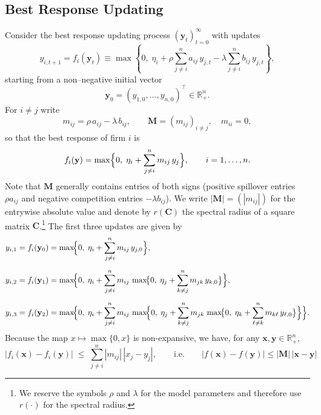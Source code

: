\subsection{Best Response Updating}
\label{sec:br}
Consider the best response updating process $(\mathbf{y}_t)_{t=0}^\infty$ with updates
\begin{equation}
y_{i,t+1}
= f_i(\mathbf{y}_t)
\equiv
\max \left\{ 0,\;
\eta_i
+
\rho \sum_{j \neq i}^n a_{ij}\, y_{j,t}
-
\lambda\sum_{j \neq i}^n b_{ij}\, y_{j,t}
\right\},
\label{eq:output-iteration}
\end{equation}
starting from a non--negative initial vector
\[
\mathbf y_{0}=(y_{1,0},\ldots ,y_{n,0})^{\top}\in\mathbb{R}^{n}_{+}.
\]
For \(i\neq j\) write
\[
m_{ij}=\rho\,a_{ij}-\lambda\,b_{ij},
\qquad
\mathbf{M}=(m_{ij})_{i\neq j},\quad m_{ii}=0,
\]
so that the best response of firm \(i\) is
\[
f_i(\mathbf y)=\max\Bigl\{0,\;\eta_i+\sum_{j\neq i}^n m_{ij}\,y_j\Bigr\}, \qquad i=1,\dots ,n.
\]
Note that $\mathbf{M}$ generally contains entries of both signs (positive spillover entries $\rho a_{ij}$ and negative competition entries $-\lambda b_{ij}$). We write $|\mathbf{M}|=(|m_{ij}|)$ for the entrywise absolute value and denote by $r(\mathbf{C})$ the spectral radius of a square matrix $\mathbf{C}$.\footnote{We reserve the symbols $\rho$ and $\lambda$ for the model parameters and therefore use $r(\cdot)$ for the spectral radius.}
The first three updates are given by
\begin{align*}
y_{i,1}
&=f_i(\mathbf y_0)
  =\max\!\Bigl\{0,\;
        \eta_i
        +\sum_{j\neq i}^n m_{ij}\,y_{j,0}
    \Bigr\},\\[6pt]
y_{i,2}
&=f_i(\mathbf y_1)
  =\max\!\Bigl\{0,\;
        \eta_i
        +\sum_{j\neq i}^n m_{ij}\,
           \max\!\bigl\{0,\;
               \eta_j
               +\sum_{k\neq j}^n m_{jk}\,y_{k,0}
           \bigr\}
    \Bigr\},\\[6pt]
y_{i,3}
&=f_i(\mathbf y_2)
  =\max\!\Bigl\{0,\;
        \eta_i
        +\sum_{j\neq i}^n m_{ij}\,
           \max\!\Bigl\{0,\;
               \eta_j
               +\sum_{k\neq j}^n m_{jk}\,
                  \max\!\bigl\{0,\;
                      \eta_k
                      +\sum_{\ell\neq k}^n m_{k\ell}\,y_{\ell,0}
                  \bigr\}
           \Bigr\}
    \Bigr\}.
\end{align*}
Because the map $x\mapsto\max\{0,x\}$ is non-expansive, we have, for any $\mathbf{x},\mathbf{y}\in\mathbb{R}^n_+$,
\[
\bigl|f_i(\mathbf{x})-f_i(\mathbf{y})\bigr|
\;\le\;
\sum_{j\neq i}^n |m_{ij}|\,|x_j-y_j|,
\qquad\text{i.e.}\qquad
\bigl|f(\mathbf{x})-f(\mathbf{y})\bigr|\le|\mathbf{M}|\,|\mathbf{x}-\mathbf{y}|
\]
